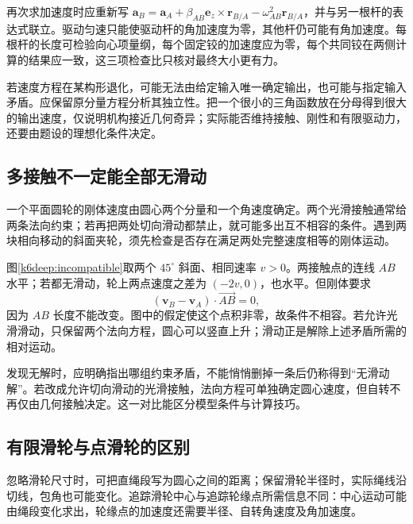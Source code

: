 再次求加速度时应重新写 $\bm a_B=\bm a_A+\beta_{AB}\bm e_z\times\bm r_{B/A}-\omega_{AB}^2\bm r_{B/A}$，并与另一根杆的表达式联立。驱动匀速只能使驱动杆的角加速度为零，其他杆仍可能有角加速度。每根杆的长度可检验向心项量纲，每个固定铰的加速度应为零，每个共同铰在两侧计算的结果应一致，这三项检查比只核对最终大小更有力。

若速度方程在某构形退化，可能无法由给定输入唯一确定输出，也可能与指定输入矛盾。应保留原分量方程分析其独立性。把一个很小的三角函数放在分母得到很大的输出速度，仅说明机构接近几何奇异；实际能否维持接触、刚性和有限驱动力，还要由题设的理想化条件决定。




\subsection{多接触不一定能全部无滑动}
一个平面圆轮的刚体速度由圆心两个分量和一个角速度确定。两个光滑接触通常给两条法向约束；若再把两处切向滑动都禁止，就可能多出互不相容的条件。遇到两块相向移动的斜面夹轮，须先检查是否存在满足两处完整速度相等的刚体运动。

图\ref{k6deep:incompatible}取两个 $45^\circ$ 斜面、相同速率 $v>0$。两接触点的连线 $AB$ 水平；若都无滑动，轮上两点速度之差为 $(-2v,0)$，也水平。但刚体要求
\[(\bm v_B-\bm v_A)\cdot\overrightarrow{AB}=0,
\]
因为 $AB$ 长度不能改变。图中的假定使这个点积非零，故条件不相容。若允许光滑滑动，只保留两个法向方程，圆心可以竖直上升；滑动正是解除上述矛盾所需的相对运动。

发现无解时，应明确指出哪组约束矛盾，不能悄悄删掉一条后仍称得到“无滑动解”。若改成允许切向滑动的光滑接触，法向方程可单独确定圆心速度，但自转不再仅由几何接触决定。这一对比能区分模型条件与计算技巧。

\subsection{有限滑轮与点滑轮的区别}
忽略滑轮尺寸时，可把直绳段写为圆心之间的距离；保留滑轮半径时，实际绳线沿切线，包角也可能变化。追踪滑轮中心与追踪轮缘点所需信息不同：中心运动可能由绳段变化求出，轮缘点的加速度还需要半径、自转角速度及角加速度。


